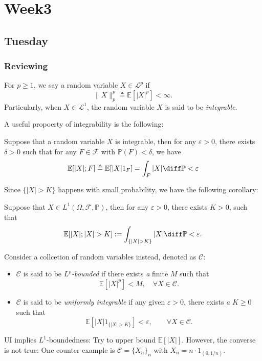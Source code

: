 
\chapter{Week3}

\section{Tuesday}

\subsection{Reviewing}
\begin{definition}
For $p\ge1$, we say a random variable $X\in\mathcal{L}^p$ if
\[
\|X\|_p^p\triangleq \mathbb{E}[|X|^p]<\infty.
\]
Particularly, when $X\in\mathcal{L}^1$, the random variable $X$ is said to be \emph{integrable}.
\end{definition}
A useful propoerty of integrability is the following:
\begin{proposition}\label{Pro:3:1}
Suppose that a random variable $X$ is integrable, then 
for any $\varepsilon>0$, there exists $\delta>0$ such that for any $F\in\mathcal{F}$ with $\mathbb{P}(F)<\delta$, we have
\[
\mathbb{E}[|X|;F]\triangleq\mathbb{E}[|X|1_F]=\int_F|X|\diff\mathbb{P}<\varepsilon
\]
\end{proposition}
Since $\{|X|>K\}$ happens with small probability, we have the following corollary:
\begin{corollary}\label{Cor:3:1}
Suppose that $X\in L^1(\Omega,\mathcal{F},\mathbb{P})$,
then for any $\varepsilon>0$, there exists $K>0$,
such that 
\[
\mathbb{E}[|X|;|X|>K]:=\int_{\{|X|>K\}}|X|\diff\mathbb{P}<\varepsilon.
\]
\end{corollary}
\begin{definition}
Consider a collcetion of random variables instead, denoted as $\mathcal{C}$:
\begin{itemize}
\item
$\mathcal{C}$ is said to be \emph{$L^p$-bounded} if there exists \emph{a} finite $M$ such that
\[
\mathbb{E}[|X|^p]<M,\quad\forall X\in\mathcal{C}.
\]
\item
$\mathcal{C}$ is said to be \emph{uniformly integrable} if any given $\varepsilon>0$, there exists \emph{a} $K\ge0$ such that
\[
\mathbb{E}[|X|1_{\{|X|>K\}}]<\varepsilon,\qquad\forall X\in\mathcal{C}.
\]
\end{itemize}
\end{definition}
\begin{remark}
UI implies $L^1$-boundedness: Try to upper bound $\mathbb{E}[|X|]$.
However, the converse is not true:
One counter-example is $\mathcal{C}=\{X_n\}_n$ with $X_n =n\cdot 1_{(0,1/n)}$.
\end{remark}

